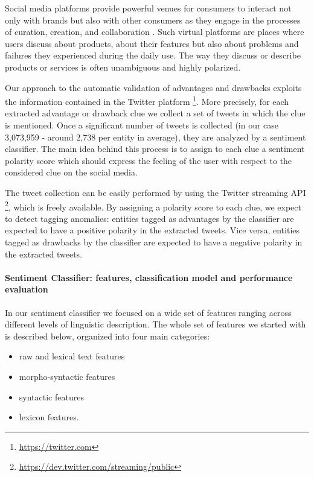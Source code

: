 \documentclass[]{book}
\providecommand{\tightlist}{%
  \setlength{\itemsep}{0pt}\setlength{\parskip}{0pt}}
\let\oldparagraph\paragraph
\renewcommand{\paragraph}[1]{\oldparagraph{#1}\mbox{}}
\let\rmarkdownfootnote\footnote%
\def\footnote{\protect\rmarkdownfootnote}
\begin{document}
Social media platforms provide powerful venues for consumers to interact
not only with brands but also with other consumers as they engage in the
processes of curation, creation, and collaboration
\citep{evans2010social}. Such virtual platforms are places where users
discuss about products, about their features but also about problems and
failures they experienced during the daily use. The way they discuss or
describe products or services is often unambiguous and highly polarized.

Our approach to the automatic validation of advantages and drawbacks
exploits the information contained in the Twitter platform \footnote{\url{https://twitter.com}}.
More precisely, for each extracted advantage or drawback clue we collect
a set of tweets in which the clue is mentioned. Once a significant
number of tweets is collected (in our case 3,073,959 - around 2,738 per
entity in average), they are analyzed by a sentiment classifier. The
main idea behind this process is to assign to each clue a sentiment
polarity score which should express the feeling of the user with respect
to the considered clue on the social media.

The tweet collection can be easily performed by using the Twitter
streaming API \footnote{\url{https://dev.twitter.com/streaming/public}},
which is freely available. By assigning a polarity score to each clue,
we expect to detect tagging anomalies: entities tagged as advantages by
the classifier are expected to have a positive polarity in the extracted
tweets. Vice versa, entities tagged as drawbacks by the classifier are
expected to have a negative polarity in the extracted tweets.

\paragraph{Sentiment Classifier: features, classification model and
performance
evaluation}\label{sentiment-classifier-features-classification-model-and-performance-evaluation}

In our sentiment classifier we focused on a wide set of features ranging
across different levels of linguistic description. The whole set of
features we started with is described below, organized into four main
categories:

\begin{itemize}
\tightlist
\item
  raw and lexical text features
\item
  morpho-syntactic features
\item
  syntactic features
\item
  lexicon features.
\end{itemize}
\end{document}
